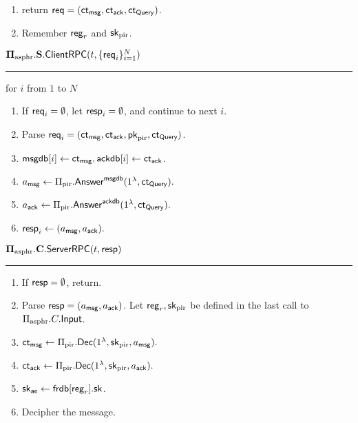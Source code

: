 \begin{definition}
\begin{enumerate}
    \item return $\mathsf{req} = (\mathsf{ct}_{\mathsf{msg}}, \mathsf{ct}_{\mathsf{ack}}, \mathsf{ct}_{\mathsf{Query}})$.
    \item Remember $\mathsf{reg}_r$ and ${\mathsf{sk}}_{\text{pir}}$.
\end{enumerate}
\vspace{10pt}
$\mathbf{\Pi_{\text{asphr}}.S.\mathsf{ClientRPC}}(t, \{\mathsf{req}_i\}_{i = 1}^N)$
\vspace{5pt}
\hrule
\vspace{5pt}
\item for $i$ from $1$ to $N$
\begin{enumerate}
    \item If $\mathsf{req}_i = \emptyset$, let $\mathsf{resp}_i = \emptyset$, and continue to next $i$. 
    \item Parse $\mathsf{req}_i = (\mathsf{ct}_{\mathsf{msg}}, \mathsf{ct}_{\mathsf{ack}}, \mathsf{pk}_{\text{pir}}, \mathsf{ct}_{\mathsf{Query}})$.
    \item $\mathsf{msgdb}[i] \leftarrow \mathsf{ct}_{\mathsf{msg}}, \mathsf{ackdb}[i] \leftarrow \mathsf{ct}_{\mathsf{ack}}$.
    \item $a_{\mathsf{msg}} \leftarrow \Pi_{\text{pir}}.\mathsf{Answer}^{\mathsf{msgdb}}(1^{\lambda}, \mathsf{ct}_{\mathsf{Query}}).$
    \item $a_{\mathsf{ack}} \leftarrow \Pi_{\text{pir}}.\mathsf{Answer}^{\mathsf{ackdb}}(1^{\lambda}, \mathsf{ct}_{\mathsf{Query}}).$
    \item $\mathsf{resp}_i \leftarrow (a_{\mathsf{msg}}, a_{\mathsf{ack}}).$
\end{enumerate}
\vspace{10pt}
$\mathbf{\Pi_{\text{asphr}}.C.\mathsf{ServerRPC}}(t, \mathsf{resp})$
\vspace{5pt}
\hrule
\vspace{5pt}
\begin{enumerate}
    \item If $\mathsf{resp} = \emptyset$, return.
    \item Parse $\mathsf{resp} = (a_{\mathsf{msg}}, a_{\mathsf{ack}})$. Let $\mathsf{reg}_r, {\mathsf{sk}}_{\text{pir}}$ be defined in the last call to $\Pi_{\text{asphr}}.C.\mathsf{Input}$.
    \item $\mathsf{ct}_{\mathsf{msg}} \leftarrow \Pi_{\text{pir}}.\mathsf{Dec}(1^{\lambda}, {\mathsf{sk}}_{\text{pir}}, a_{\mathsf{msg}}).$
    \item $\mathsf{ct}_{\mathsf{ack}} \leftarrow \Pi_{\text{pir}}.\mathsf{Dec}(1^{\lambda}, {\mathsf{sk}}_{\text{pir}}, a_{\mathsf{ack}}).$
    \item ${\mathsf{sk}}_{\mathsf{ae}} \leftarrow \mathsf{frdb}[\mathsf{reg}_r].{\mathsf{sk}}$.
    \item Decipher the message.
    \begin{enumerate}

\end{enumerate}
\end{enumerate}
\end{definition}

